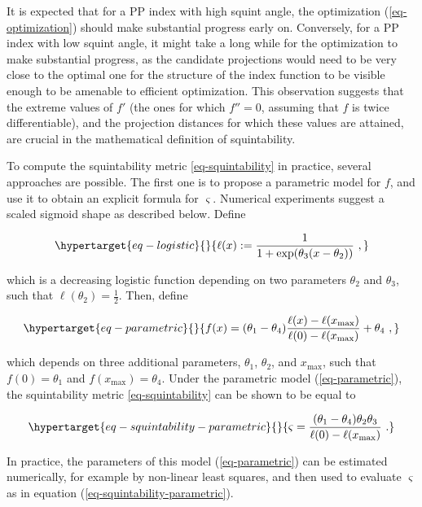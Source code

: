 \documentclass[
  12pt,
]{interact}
\theoremstyle{plain}
\begin{document}
It is expected that for a PP index with high squint angle, the
optimization (\ref{eq-optimization}) should make substantial progress
early on. Conversely, for a PP index with low squint angle, it might
take a long while for the optimization to make substantial progress, as
the candidate projections would need to be very close to the optimal one
for the structure of the index function to be visible enough to be
amenable to efficient optimization. This observation suggests that the
extreme values of \(f'\) (the ones for which \(f''=0\), assuming that
\(f\) is twice differentiable), and the projection distances for which
these values are attained, are crucial in the mathematical definition of
squintability.

To compute the squintability metric \eqref{eq-squintability} in
practice, several approaches are possible. The first one is to propose a
parametric model for \(f\), and use it to obtain an explicit formula for
\(\varsigma\). Numerical experiments suggest a scaled sigmoid shape as
described below. Define

\begin{equation}\protect\hypertarget{eq-logistic}{}{
\ell(x):=\frac{1}{1+\exp(\theta_{3}(x-\theta_{2}))}\ ,
}\label{eq-logistic}\end{equation}

which is a decreasing logistic function depending on two parameters
\(\theta_2\) and \(\theta_3\), such that
\(\ell(\theta_{2})=\frac{1}{2}\). Then, define

\begin{equation}\protect\hypertarget{eq-parametric}{}{
f(x)=(\theta_{1}-\theta_{4})\frac{\ell(x)-\ell(x_{\max})}{\ell(0)-\ell(x_{\max})}+\theta_{4}\ ,
}\label{eq-parametric}\end{equation}

which depends on three additional parameters, \(\theta_1\),
\(\theta_2\), and \(x_{\max}\), such that \(f(0)=\theta_1\) and
\(f(x_{\max})=\theta_4\). Under the parametric model
(\ref{eq-parametric}), the squintability metric \eqref{eq-squintability}
can be shown to be equal to

\begin{equation}\protect\hypertarget{eq-squintability-parametric}{}{
\varsigma=\frac{(\theta_{1}-\theta_{4})\theta_{2}\theta_{3}}{\ell(0)-\ell(x_{\max})}\ .
}\label{eq-squintability-parametric}\end{equation}

In practice, the parameters of this model (\ref{eq-parametric}) can be
estimated numerically, for example by non-linear least squares, and then
used to evaluate \(\varsigma\) as in equation
(\ref{eq-squintability-parametric}).
\end{document}

